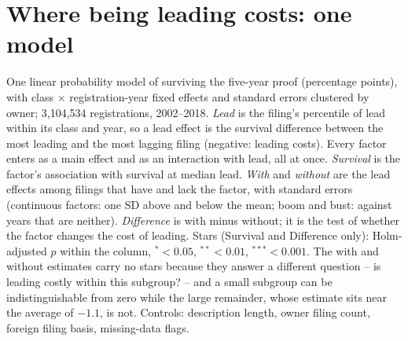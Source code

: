 \section*{Where being leading costs: one model}
One linear probability model of surviving the five-year proof (percentage points), with class $\times$ registration-year fixed effects and standard errors clustered by owner; 3,104,534 registrations, 2002--2018. \emph{Lead} is the filing's percentile of lead within its class and year, so a lead effect is the survival difference between the most leading and the most lagging filing (negative: leading costs). Every factor enters as a main effect and as an interaction with lead, all at once. \emph{Survival} is the factor's association with survival at median lead. \emph{With} and \emph{without} are the lead effects among filings that have and lack the factor, with standard errors (continuous factors: one SD above and below the mean; boom and bust: against years that are neither). \emph{Difference} is with minus without; it is the test of whether the factor changes the cost of leading. Stars (Survival and Difference only): Holm-adjusted $p$ within the column, $^{*}<0.05$, $^{**}<0.01$, $^{***}<0.001$. The with and without estimates carry no stars because they answer a different question -- is leading costly within this subgroup? -- and a small subgroup can be indistinguishable from zero while the large remainder, whose estimate sits near the average of $-1.1$, is not. Controls: description length, owner filing count, foreign filing basis, missing-data flags.

